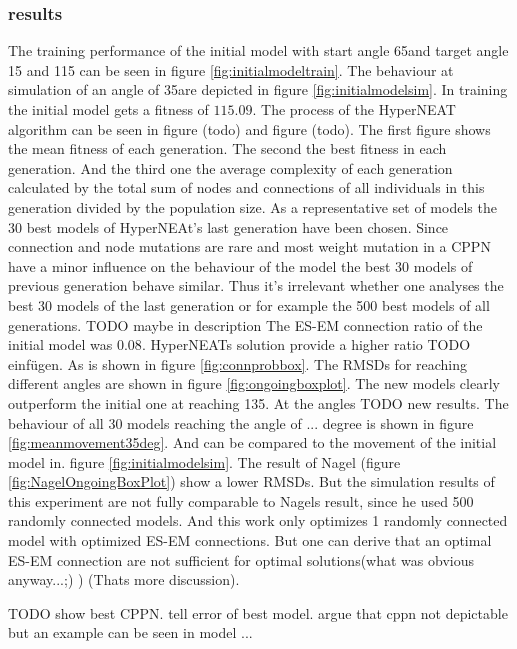 \subsubsection{results}
The training  performance of the initial model with start angle 65\degree and target angle 15 and 115 \degree can be seen in figure \ref{fig:initialmodeltrain}. The behaviour at simulation of an angle of 35\degree are depicted in figure \ref{fig:initialmodelsim}. In training the initial model gets a fitness of $115.09$. The process of the HyperNEAT algorithm can be seen in figure (todo) and figure (todo). The first figure shows the mean fitness of each generation. The second the best fitness in each generation. And the third one the average complexity of each generation calculated by the total sum of nodes and connections of all individuals in this generation divided by the population size. 
As a representative set of models the 30 best models of HyperNEAt's last generation have been chosen. Since connection and node mutations are rare and most weight mutation in a CPPN have a minor influence on the behaviour of the model the best 30 models of previous generation behave similar. Thus it's irrelevant whether one analyses the best 30 models of the last generation or for example the 500 best models of all generations. TODO maybe in description
The ES-EM connection ratio of the initial model was $0.08$. HyperNEATs solution provide a higher ratio TODO  einfügen. As is shown in figure \ref{fig:connprobbox}. The RMSDs for reaching different angles are shown in figure \ref{fig:ongoingboxplot}.  The new models clearly outperform the initial one at reaching 135\degree. At the angles TODO new results. The behaviour of all 30 models reaching the angle of ... degree is shown in figure \ref{fig:meanmovement35deg}. And can be compared to the movement of the initial model in. figure \ref{fig:initialmodelsim}. The result of Nagel (figure \ref{fig:NagelOngoingBoxPlot}) show a lower RMSDs.  But the simulation results of this experiment are not fully comparable to Nagels result, since he used 500 randomly connected models. And this work only optimizes 1 randomly connected model with optimized ES-EM connections. But one can derive that an optimal ES-EM connection are not sufficient for optimal solutions(what was obvious anyway...;) ) (Thats more discussion).

TODO show best CPPN.  tell error of best model. argue that cppn not depictable but an example can be seen in model ...

